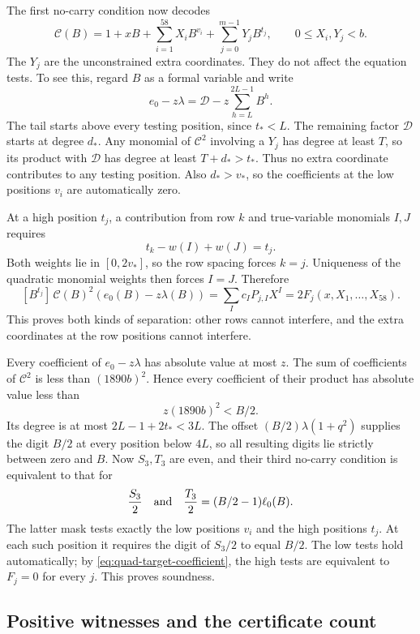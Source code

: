 The first no-carry condition now decodes
\[
 \mathcal C(B)=1+xB+
       \sum_{i=1}^{58}X_i B^{v_i}
       +\sum_{j=0}^{m-1}Y_j B^{t_j},
 \qquad 0\le X_i,Y_j<b.
\]
The $Y_j$ are the unconstrained extra coordinates. They do not affect
the equation tests. To see this, regard $B$ as a formal variable and
write
\[
 e_0-z\lambda
   =\mathcal D-z\sum_{h=L}^{2L-1}B^h.
\]
The tail starts above every testing position, since $t_*<L$.
The remaining factor $\mathcal D$ starts at degree $d_*$.
Any monomial of $\mathcal C^2$ involving a $Y_j$ has degree at least
$T$, so its product with $\mathcal D$ has degree at least
$T+d_*>t_*$. Thus no extra coordinate contributes to any testing
position. Also $d_*>v_*$, so the coefficients at the low positions
$v_i$ are automatically zero.

At a high position $t_j$, a contribution from row $k$ and true-variable
monomials $I,J$ requires
\[
 t_k-w(I)+w(J)=t_j.
\]
Both weights lie in $[0,2v_*]$, so the row spacing forces $k=j$.
Uniqueness of the quadratic monomial weights then forces $I=J$. Therefore
\begin{equation}\label{eq:quad-target-coefficient}
 [B^{t_j}]\,\mathcal C(B)^2(e_0(B)-z\lambda(B))
       =\sum_I c_I P_{j,I}X^I=2F_j(x,X_1,\ldots,X_{58}).
\end{equation}
This proves both kinds of separation: other rows cannot interfere,
and the extra coordinates at the row positions cannot interfere.

Every coefficient of $e_0-z\lambda$ has absolute value at most $z$.
The sum of coefficients of $\mathcal C^2$ is less than
$(1890b)^2$. Hence every coefficient of their product has absolute
value less than
\[
 z(1890b)^2<B/2.
\]
Its degree is at most $2L-1+2t_*<3L$. The offset
$(B/2)\lambda(1+q^2)$ supplies the digit $B/2$ at every position
below $4L$, so all resulting digits lie strictly between zero and $B$.
Now $S_3,T_3$ are even, and their third no-carry condition is equivalent
to that for
\[
 \frac{S_3}{2}\quad\hbox{and}\quad
 \frac{T_3}{2}=(B/2-1)\ell_0(B).
\]
The latter mask tests exactly the low positions $v_i$ and the high
positions $t_j$. At each such position it requires the digit of
$S_3/2$ to equal $B/2$. The low tests hold automatically; by
\eqref{eq:quad-target-coefficient}, the high tests are equivalent to
$F_j=0$ for every $j$. This proves soundness.

\subsection{Positive witnesses and the certificate count}

